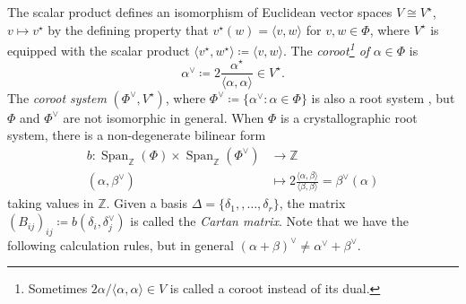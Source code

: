 \documentclass[12pt]{amsart}
\numberwithin{equation}{section}
\theoremstyle{remark} %
\begin{document}
The scalar product defines an isomorphism of Euclidean vector spaces $V \cong V^\star$, $v \mapsto v^\star$ by the defining property that $v^\star(w) = \langle v, w \rangle$ for $v,w \in \Phi$, where $V^\star$ is equipped with the scalar product $\langle v^\star , w^\star  \rangle \coloneqq  \langle v,w \rangle$. The \emph{coroot\footnote{Sometimes $2\alpha/\langle \alpha , \alpha \rangle \in V$ is called a coroot instead of its dual. }  of} $\alpha \in \Phi$ is 
$$
 \alpha^\vee \coloneqq 2\frac{\alpha^\star}{\langle \alpha, \alpha \rangle} \in V^\star.
$$  
The \emph{coroot system} $(\Phi^\vee, V^\star)$, where $\Phi^\vee \coloneqq \{ \alpha^\vee \colon \alpha \in \Phi  \}$ is also a root system \cite[VI\S1.1]{Bou08}, but $\Phi$ and $\Phi^\vee$ are not isomorphic in general. When $\Phi$ is a crystallographic root system, there is a non-degenerate bilinear form
\begin{align*}
	b \colon \operatorname{Span}_{\mathbb{Z}}(\Phi) \times \operatorname{Span}_{\mathbb{Z}}( \Phi^\vee) & \to \mathbb{Z} \\
	(\alpha, \beta^\vee) & \mapsto 2\frac{\langle \alpha, \beta \rangle}{\langle \beta , \beta \rangle} = \beta^\vee(\alpha)
\end{align*}
taking values in $\mathbb{Z}$. Given a basis $\Delta = \{\delta_1, ,\ldots, \delta_r\}$, the matrix $(B_{ij})_{ij} \coloneqq b(\delta_i, \delta_j^\vee)$ is called the \emph{Cartan matrix}. Note that we have the following calculation rules, but in general $(\alpha + \beta)^\vee \neq \alpha^\vee + \beta^\vee$.
\end{document}
